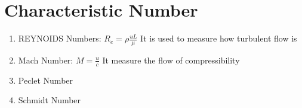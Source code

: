 \documentclass[12pt]{report}
\newcommand{\dsp}{\displaystyle}
\begin{document}
	\section{Characteristic Number}
	\begin{enumerate}
		\item REYNOIDS Numbers: $\dsp R_e = \rho \frac{uL}{\mu}$ It is used to measure how turbulent flow is
		
		\item Mach Number: $\dsp M = \frac{u}{c}$ It measure the flow of compressibility
		
		\item Peclet Number
		
		\item Schmidt Number
	\end{enumerate}



\end{document}
